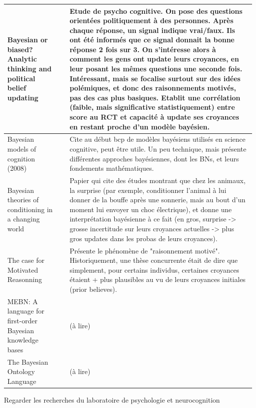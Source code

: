 \documentclass[french]{report}
\begin{document}
    \newpage
    \begin{table}[h]
        \begin{center}
        \begin{tabular}{|p{}|p{}|p{}|}
            \hline
            Bayesian or biased? Analytic thinking and political belief updating
            & 
            & Etude de psycho cognitive. On pose des questions orientées politiquement à des personnes. Après chaque réponse, un signal indique vrai/faux. Ils ont été informés que ce signal donnait la bonne réponse 2 fois sur 3. On s'intéresse alors à comment les gens ont update leurs croyances, en leur posant les mêmes questions une seconde fois. Intéressant, mais se focalise surtout sur des idées polémiques, et donc des raisonnements motivés, pas des cas plus basiques. Etablit une corrélation (faible, mais significative statistiquement) entre score au RCT et capacité à update ses croyances en restant proche d'un modèle bayésien.
            \\
            \hline
            Bayesian models of cognition (2008)
            &
            & Cite au début bcp de modèles bayésiens utilisés en science cognitive, peut être utile. Un peu technique, mais présente différentes approches bayésiennes, dont les BNs, et leurs fondements mathématiques.
            \\
            \hline
            Bayesian theories of conditioning in a changing world
            &
            & Papier qui cite des études montrant que chez les animaux, la surprise (par exemple, conditionner l'animal à lui donner de la bouffe après une sonnerie, mais au bout d'un moment lui envoyer un choc électrique), et donne une interprétation bayésienne à ce fait (en gros, surprise -> grosse incertitude sur leurs croyances actuelles -> plus gros updates dans les probas de leurs croyances).
            \\
            \hline

            The case for Motivated Reasonning
            &
            & Présente le phénomène de "raisonnement motivé". Historiquement, une thèse concurrente était de dire que simplement, pour certains individus, certaines croyances étaient + plus plausibles au vu de leurs croyances initiales (prior believes).
            \\
            \hline


            MEBN: A language for first-order Bayesian knowledge bases
            &
            & (à lire)
            \\ 
            \hline
            The Bayesian Ontology Language
            &
            & (à lire)
            \\
            \hline
        \end{tabular}
    \end{center}
    \end{table}

    Regarder les recherches du laboratoire de psychologie et neurocognition

    \nocite{*}
    
    
\end{document}
